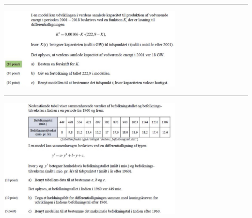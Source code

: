 \begin{center}
	\hrule
	\includegraphics[width=0.7\textwidth]{Billeder/opg7m.jpg}
	\hrule
	\includegraphics[width=0.7\textwidth]{Billeder/opg8m.jpg}
\end{center}